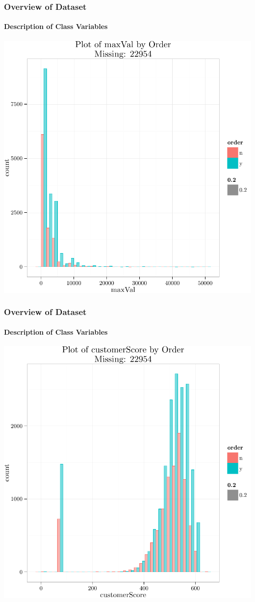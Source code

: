 \documentclass[xcolor=dvipsnames,gray,mathserif]{beamer}
\begin{document}
\begin{frame}
   \frametitle{Overview of Dataset}
   \framesubtitle{Description of Class Variables}

   \centerline{\includegraphics[width=.8\linewidth,height=.8\linewidth]{./figs/graphics-SingleDimPlot3}}
\end{frame}
\begin{frame}
   \frametitle{Overview of Dataset}
   \framesubtitle{Description of Class Variables}

   \centerline{\includegraphics[width=.8\linewidth,height=.8\linewidth]{./figs/graphics-SingleDimPlot4}}
\end{frame}
\end{document}
